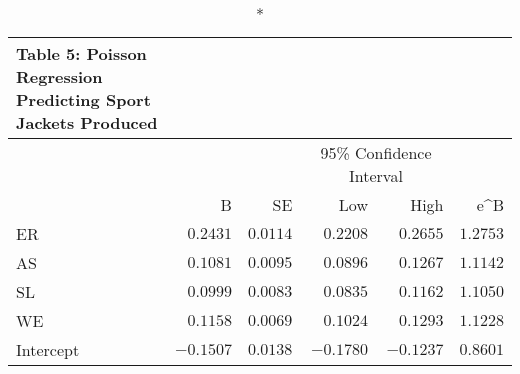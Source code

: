 \begin{longtable}{l|rrrrr}
\caption*{
{\large Table 5: Poisson Regression Predicting Sport Jackets Produced}
} \\ 
\toprule
\multicolumn{1}{l}{} &  &  & \multicolumn{2}{c}{95\% Confidence Interval} &  \\ 
\cmidrule(lr){4-5}
\multicolumn{1}{l}{} & B & SE & Low & High & e\textasciicircum{}B \\ 
\midrule
ER & $0.2431$ & $0.0114$ & $0.2208$ & $0.2655$ & $1.2753$ \\ 
AS & $0.1081$ & $0.0095$ & $0.0896$ & $0.1267$ & $1.1142$ \\ 
SL & $0.0999$ & $0.0083$ & $0.0835$ & $0.1162$ & $1.1050$ \\ 
WE & $0.1158$ & $0.0069$ & $0.1024$ & $0.1293$ & $1.1228$ \\ 
Intercept & $-0.1507$ & $0.0138$ & $-0.1780$ & $-0.1237$ & $0.8601$ \\ 
\bottomrule
\end{longtable}

